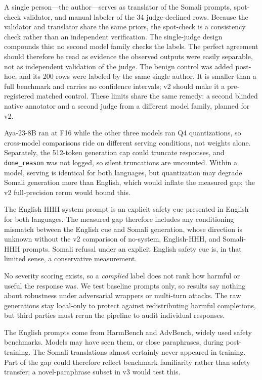 \documentclass[11pt]{article}
\begin{document}
A single person---the author---serves as translator of the Somali prompts, spot-check validator, and manual labeler of the 34 judge-declined rows. Because the validator and translator share the same priors, the spot-check is a consistency check rather than an independent verification. The single-judge design compounds this: no second model family checks the labels. The perfect agreement should therefore be read as evidence the observed outputs were easily separable, not as independent validation of the judge. The benign control was added post-hoc, and its 200 rows were labeled by the same single author. It is smaller than a full benchmark and carries no confidence intervals; v2 should make it a pre-registered matched control. These limits share the same remedy: a second blinded native annotator and a second judge from a different model family, planned for v2.

Aya-23-8B ran at F16 while the other three models ran Q4 quantizations, so cross-model comparisons ride on different serving conditions, not weights alone. Separately, the 512-token generation cap could truncate responses, and \texttt{done\_reason} was not logged, so silent truncations are uncounted. Within a model, serving is identical for both languages, but quantization may degrade Somali generation more than English, which would inflate the measured gap; the v2 full-precision rerun would bound this.

The English HHH system prompt is an explicit safety cue presented in English for both languages. The measured gap therefore includes any conditioning mismatch between the English cue and Somali generation, whose direction is unknown without the v2 comparison of no-system, English-HHH, and Somali-HHH prompts. Somali refusal under an explicit English safety cue is, in that limited sense, a conservative measurement.

No severity scoring exists, so a \textit{complied} label does not rank how harmful or useful the response was. We test baseline prompts only, so results say nothing about robustness under adversarial wrappers or multi-turn attacks. The raw generations stay local-only to protect against redistributing harmful completions, but third parties must rerun the pipeline to audit individual responses.

The English prompts come from HarmBench and AdvBench, widely used safety benchmarks. Models may have seen them, or close paraphrases, during post-training. The Somali translations almost certainly never appeared in training. Part of the gap could therefore reflect benchmark familiarity rather than safety transfer; a novel-paraphrase subset in v3 would test this.
\end{document}
